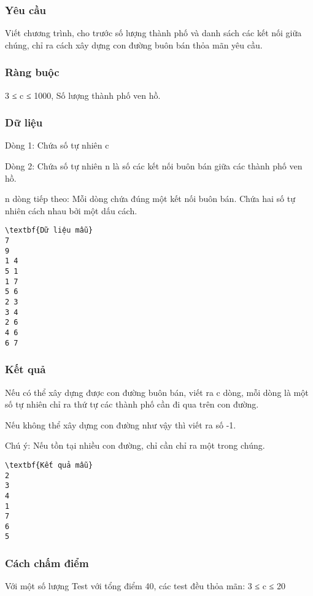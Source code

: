 \subsubsection{   Yêu cầu  }

   Viết chương trình, cho trước số lượng thành phố và danh sách các kết nối giữa chúng, chỉ ra cách xây dựng con đường buôn bán thỏa mãn yêu cầu.  

\subsubsection{   Ràng buộc  }

   3 ≤ c ≤ 1000, Số lượng thành phố ven hồ.  

\subsubsection{   Dữ liệu  }

   Dòng 1: Chứa số tự nhiên c  

   Dòng  2:   Chứa số tự nhiên n là số các kết nối buôn bán giữa các thành phố ven hồ.  

   n dòng tiếp theo:   Mỗi dòng chứa đúng một kết nối buôn bán. Chứa hai số tự nhiên cách nhau bởi một dấu cách.  
\begin{verbatim}
\textbf{Dữ liệu mẫu}
7
9
1 4
5 1
1 7
5 6
2 3
3 4
2 6
4 6
6 7
\end{verbatim}

\subsubsection{   Kết quả  }

   Nếu có thể xây dựng được con đường buôn bán, viết ra c dòng, mỗi dòng là một số tự nhiên chỉ ra thứ tự các thành phố cần đi qua trên con đường.  

   Nếu không thể xây dựng con đường như vậy thì viết ra số -1.  

   Chú ý: Nếu tồn tại nhiều con đường, chỉ cần chỉ ra một trong chúng.  
\begin{verbatim}
\textbf{Kết quả mẫu}
2
3
4
1
7
6
5
\end{verbatim}

\subsubsection{   Cách chấm điểm  }

   Với một số lượng Test với tổng điểm 40, các test đều thỏa mãn: 3 ≤ c ≤ 20  

